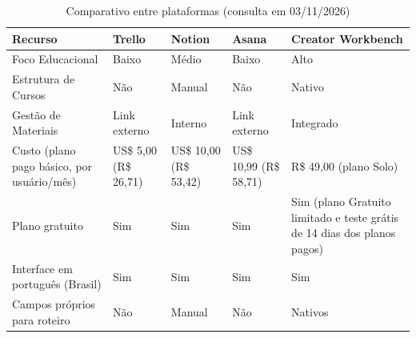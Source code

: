 \begin{table}[H]
\centering
\small
\caption{Comparativo entre plataformas (consulta em 03/11/2026)}
\begin{tabular}{|p{3.6cm}|p{2.2cm}|p{2.2cm}|p{2.2cm}|p{2.6cm}|}
\hline
\textbf{Recurso} & \textbf{Trello} & \textbf{Notion} & \textbf{Asana} & \textbf{Creator Workbench} \\
\hline
Foco Educacional & Baixo & Médio & Baixo & Alto \\
\hline
Estrutura de Cursos & Não & Manual & Não & Nativo \\
\hline
Gestão de Materiais & Link externo & Interno & Link externo & Integrado \\
\hline
Custo (plano pago básico, por usuário/mês) & US\$ 5,00 (R\$ 26,71) & US\$ 10,00 (R\$ 53,42) & US\$ 10,99 (R\$ 58,71) & R\$ 49,00 (plano Solo) \\
\hline
Plano gratuito & Sim & Sim & Sim & Sim (plano Gratuito limitado e teste grátis de 14 dias dos planos pagos) \\
\hline
Interface em português (Brasil) & Sim & Sim & Sim & Sim \\
\hline
Campos próprios para roteiro & Não & Manual & Não & Nativos \\
\hline
\end{tabular}
\label{tab:comparativo}
\end{table}